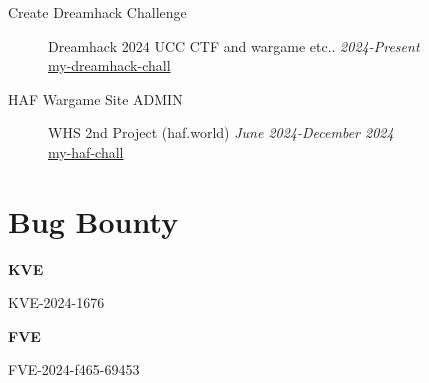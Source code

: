 \documentclass[margin,line]{resume}
\begin{document}
\begin{resume}
\begin{description}
                \item[Create Dreamhack Challenge]\small{Dreamhack 2024 UCC CTF and wargame etc.. \hfill \textsl{2024-Present}}\\
  	      		\faGithub\space\href{https://github.com/minchan02/WarGame}{my-dreamhack-chall}
 			\vspace{2mm}

                \item[HAF Wargame Site ADMIN]\small{WHS 2nd Project (haf.world) \hfill \textsl{June 2024-December 2024}}\\
  	      		\faGithub\space\href{https://github.com/minchan02/WarGame}{my-haf-chall}
 			\vspace{2mm}
    \end{description}
    \vspace{2cm} 
    \newpage

        \section{\mysidestyle Bug Bounty}\vspace{2mm}
        \textbf{KVE}
        \vspace{1mm}
        \begin{list2}
          \item KVE-2024-1676
        \end{list2}
        
        \textbf{FVE}
        \vspace{1mm}
        \begin{list2}
          \item FVE-2024-f465-69453
        \end{list2}
\end{resume}   
\end{document}
